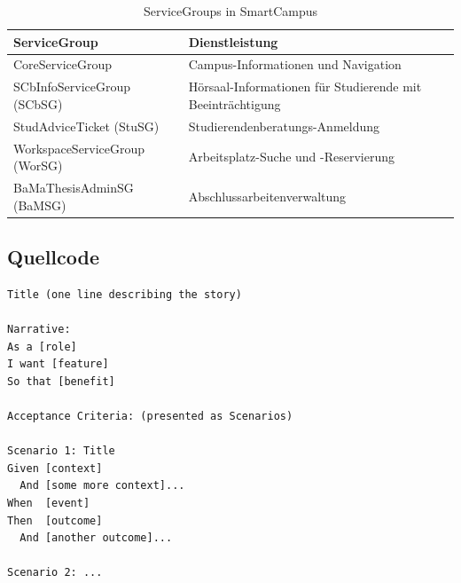 \begin{table}
	\centering
	\begin{tabular}{ | l | p{7cm} | }
		\hline
		ServiceGroup & Dienstleistung \\
		\hline
		 CoreServiceGroup & Campus-Informationen und Navigation \\
	 	\hline
	 	SCbInfoServiceGroup (SCbSG) & Hörsaal-Informationen für Studierende mit Beeinträchtigung \\
	 	\hline
	 	 StudAdviceTicket (StuSG) & Studierendenberatungs-Anmeldung \\
	 	\hline
	 	WorkspaceServiceGroup (WorSG) & Arbeitsplatz-Suche und -Reservierung \\
	 	\hline
	 	BaMaThesisAdminSG (BaMSG) & Abschlussarbeitenverwaltung \\
	 	\hline
	\end{tabular}
	\caption{ServiceGroups in SmartCampus}
	\label{tab:smartcampus-servicegroups}
\end{table}

\subsection{Quellcode}
\vspace{0.5cm}
\begin{lstlisting}[caption = {Vorlage für eine Story und Szenarien nach BDD}, label = {lst:bdd-stories-szenarien-template}, style = kit-cm, language = Gherkin]
Title (one line describing the story)
 
Narrative:
As a [role]
I want [feature]
So that [benefit]
 
Acceptance Criteria: (presented as Scenarios)
 
Scenario 1: Title
Given [context]
  And [some more context]...
When  [event]
Then  [outcome]
  And [another outcome]...
 
Scenario 2: ...
\end{lstlisting}

